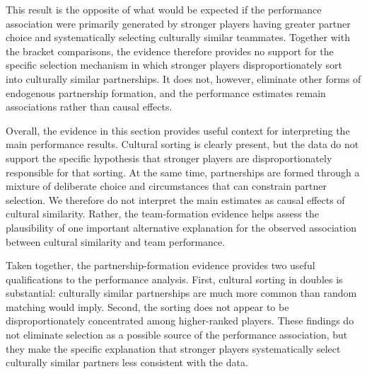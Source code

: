 \documentclass[10pt]{article}
\begin{document}
This result is the opposite of what would be expected if the performance association were primarily generated by stronger players having greater partner choice and systematically selecting culturally similar teammates. Together with the bracket comparisons, the evidence therefore provides no support for the specific selection mechanism in which stronger players disproportionately sort into culturally similar partnerships. It does not, however, eliminate other forms of endogenous partnership formation, and the performance estimates remain associations rather than causal effects.

Overall, the evidence in this section provides useful context for interpreting the main performance results. Cultural sorting is clearly present, but the data do not support the specific hypothesis that stronger players are disproportionately responsible for that sorting. At the same time, partnerships are formed through a mixture of deliberate choice and circumstances that can constrain partner selection. We therefore do not interpret the main estimates as causal effects of cultural similarity. Rather, the team-formation evidence helps assess the plausibility of one important alternative explanation for the observed association between cultural similarity and team performance.

Taken together, the partnership-formation evidence provides two useful qualifications to the performance analysis. First, cultural sorting in doubles is substantial: culturally similar partnerships are much more common than random matching would imply. Second, the sorting does not appear to be disproportionately concentrated among higher-ranked players. These findings do not eliminate selection as a possible source of the performance association, but they make the specific explanation that stronger players systematically select culturally similar partners less consistent with the data.
\end{document}
